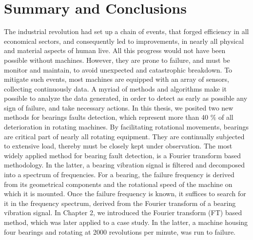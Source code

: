 \documentclass[thesis.tex]{subfiles}
\begin{document}
	\section{Summary and Conclusions}
	\label{sec:summary_and_conclusions}
	The industrial revolution had set up a chain of events, that forged efficiency in all economical sectors, and consequently led to improvements, in nearly all physical and material aspects of human live. All this progress would not have been possible without machines. However, they are prone to failure, and must be monitor and maintain, to avoid unexpected and catastrophic breakdown. To mitigate such events, most machines are equipped with an array of sensors, collecting continuously data. A myriad of methods and algorithms make it possible to analyze the data generated, in order to detect as early as possible any sign of failure, and take necessary actions.
	\justify
	In this thesis, we posited two new methods for bearings faults detection, which represent more than 40 $\%$ of all deterioration in rotating machines. By facilitating rotational movements, bearings are critical part of nearly all rotating equipment. They are continually subjected to extensive load, thereby must be closely kept under observation. The most widely applied method for bearing fault detection, is a Fourier transform based methodology. In the latter, a bearing vibration signal is filtered and decomposed into a spectrum of frequencies. For a bearing, the failure frequency is derived from its geometrical components and the rotational speed of the machine on which it is mounted. Once the failure frequency is known, it suffices to search for it in the frequency spectrum, derived from the Fourier transform of a bearing vibration signal. 
	\justify
	In Chapter 2, we introduced the Fourier transform (FT) based method, which was later applied to a case study.
	In the latter, a machine housing four bearings and rotating at 2000 revolutions per minute, was run to failure.
\end{document}
